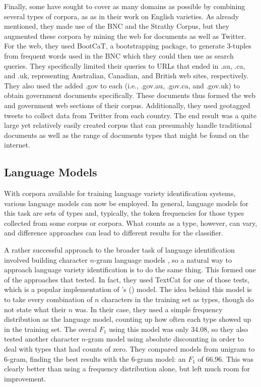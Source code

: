 \documentclass{article}
\begin{document}
      Finally, some have sought to cover as many domains as possible by combining several types of corpora, as as \textcite{lui_classifying_2013} in their work on English varieties.
      As already mentioned, they made use of the BNC and the Strathy Corpus, but they augmented these corpora by mining the web for documents as well as Twitter.
      For the web, they used BootCaT, a bootstrapping package, to generate 3-tuples from frequent words used in the BNC which they could then use as search queries.
      They specifically limited their queries to URLs that ended in .au, .ca, and .uk, representing Australian, Canadian, and British web sites, respectively.
      They also used the added .gov to each (i.e., .gov.au, .gov.ca, and .gov.uk) to obtain government documents specifically.
      These documents thus formed the web and government web sections of their corpus.
      Additionally, they used geotagged tweets to collect data from Twitter from each country.
      The end result was a quite large yet relatively easily created corpus that can presumably handle traditional documents as well as the range of documents types that might be found on the internet.

    \subsection{Language Models}
      With corpora available for training language variety identification systems, various language models can now be employed.
      In general, language models for this task are sets of types and, typically, the token frequencies for those types collected from some corpus or corpora.
      What counts as a type, however, can vary, and difference approaches can lead to different results for the classifier.

      A rather successful approach to the broader task of language identification involved building character $n$-gram language models \parencite{cavnar_n-gram-based_1994}, so a natural way to approach language variety identification is to do the same thing.
      This formed one of the approaches that \textcite{maier_language_2014} tested.
      In fact, they used TextCat for one of those tests, which is a popular implementation of \citeauthor{cavnar_n-gram-based_1994}'s (\citeyear{cavnar_n-gram-based_1994}) model.
      The idea behind this model is to take every combination of $n$ characters in the training set as types, though \textcite{maier_language_2014} do not state what their $n$ was.
      In their case, they used a simple frequency distribution as the language model, counting up how often each type showed up in the training set.
      The overal $F_1$ using this model was only 34.08, so they also tested another character $n$-gram model using absolute discounting in order to deal with types that had counts of zero.
      They compared models from unigram to 6-gram, finding the best results with the 6-gram model: an $F_1$ of 66.96.
      This was clearly better than using a frequency distribution alone, but left much room for improvement.
\end{document}
